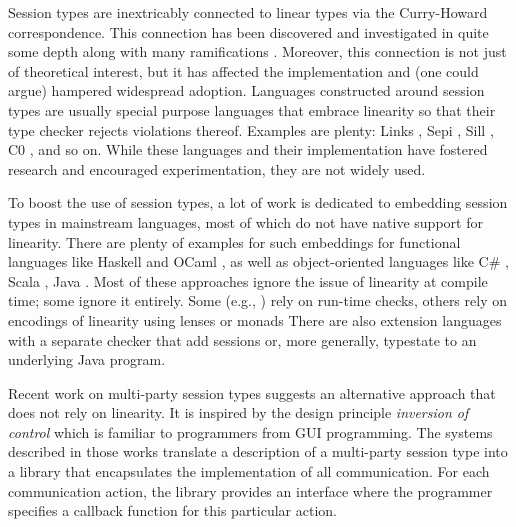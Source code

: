 \documentclass[acmsmall,screen,anonymous,review]{acmart}
\begin{document}
Session types are inextricably connected to linear types via the
Curry-Howard correspondence. This connection has been discovered and
investigated in quite some depth
\cite{DBLP:conf/concur/CairesP10,DBLP:journals/mscs/CairesPT16,DBLP:journals/jfp/Wadler14}
along with many ramifications \cite{DBLP:journals/pacmpl/BalzerP17}. 
Moreover, this connection is not just of theoretical interest, but it
has affected the implementation and (one could argue) hampered widespread
adoption. Languages constructed around session types are usually
special purpose languages that embrace linearity so that their type
checker rejects violations thereof. Examples are plenty: Links \cite{lindley17:_light_funct_session_types},
Sepi \cite{DBLP:conf/sefm/FrancoV13,DBLP:conf/sfm/Vasconcelos09}, Sill
\cite{DBLP:conf/esop/ToninhoCP13}, C0
\cite{DBLP:journals/corr/WillseyPP17}, and so on.
While these languages and their implementation have fostered research
and encouraged experimentation, they are not widely used.

To boost the use of session types, 
a lot of work is dedicated to embedding session types in mainstream
languages, most of which do not have native support for linearity. 
There are plenty of examples for such embeddings for functional languages
like
Haskell \cite{DBLP:conf/padl/NeubauerT04,SackmanE08,
  DBLP:conf/haskell/PucellaT08} and
OCaml \cite{DBLP:journals/jfp/Padovani17,DBLP:journals/scp/ImaiYY19},
as well as object-oriented languages like
C\# \cite{DBLP:journals/corr/abs-2004-01325},
Scala \cite{DBLP:conf/ecoop/ScalasY16},
Java \cite{DBLP:conf/ecoop/HuYH08}. Most of these approaches ignore
the issue of linearity at compile time; some ignore it entirely. Some (e.g., \cite{DBLP:journals/jfp/Padovani17}) rely
on run-time checks, others rely on encodings of linearity using lenses
\cite{DBLP:journals/jip/ImaiG19} or monads \cite{DBLP:conf/haskell/PucellaT08}
There are also extension languages with a separate checker that add
sessions \cite{DBLP:conf/coordination/NgYPHK11} or, more generally,
typestate \cite{DBLP:journals/scp/KouzapasDPG18} to an underlying Java program.

Recent work on multi-party session types
\cite{DBLP:conf/cc/Miu0Y021,DBLP:journals/pacmpl/00020HNY20} suggests
an alternative approach that does not rely on linearity. It is
inspired by the design principle \emph{inversion of control} which is
familiar to programmers from GUI programming. The systems described in
those works translate a description of a multi-party session type into
a library that encapsulates the implementation of all
communication. For each communication action, the library provides an
interface where the programmer specifies a callback function for this
particular action.
\end{document}
